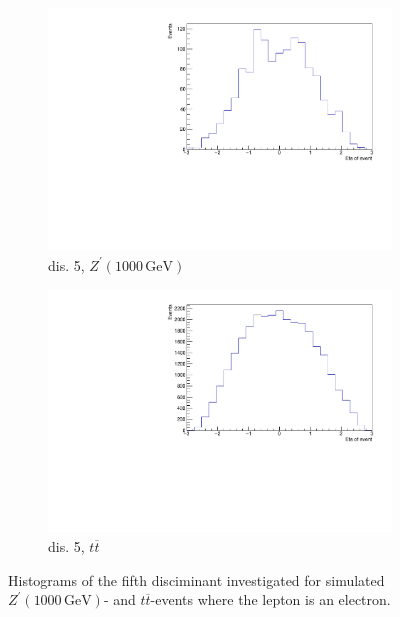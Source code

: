 \begin{figure}[H]
  \begin{subfigure}{0.45\textwidth}%
    \centering%
    \includegraphics[width=\textwidth]{plots/discriminant/zprime1000.el_dis5.pdf}%
    \caption{dis. 5, $Z^\prime(1000 \, \si{\giga\eV})$}%
    \label{fig:6a}%
  \end{subfigure}%
  \hfill
  \begin{subfigure}{0.45\textwidth}%
    \centering%
    \includegraphics[width=\textwidth]{plots/discriminant/ttbar.el_dis5.pdf}%
    \caption{dis. 5, $t \overline{t}$}%
    \label{fig:6b}%
  \end{subfigure}%
  \caption{Histograms of the fifth disciminant investigated for simulated $Z^\prime(1000 \, \si{\giga\eV})$- and $t \overline{t}$-events where the lepton is an electron.}%
  \label{fig:6}%
\end{figure}


